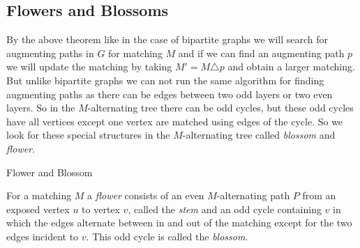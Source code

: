 \subsection{Flowers and Blossoms}
By the above theorem like in the case of bipartite graphs we will search for augmenting paths in $G$ for matching $M$ and if we can find an augmenting path $p$ we will update the matching by taking $M'=M\triangle p$ and obtain a larger matching. But unlike bipartite graphs we can not run the same algorithm for finding augmenting paths as there can be edges between two odd layers or two even layers. So in the $M$-alternating tree there can be odd cycles, but these odd cycles have all vertices except one vertex are matched using edges of the cycle. So we look for these special structures in the $M$-alternating tree called \emph{blossom} and \emph{flower}.
\begin{Definition}{Flower and Blossom}{}
	\begin{minipage}{0.65\textwidth}
		For a matching $M$ a \emph{flower} consists of an even $M$-alternating path $P$ from an exposed vertex $u$ to vertex $v$, called the \emph{stem} and an odd cycle containing $v$ in which the edges alternate between in and out of the matching except for the two edges incident to $v$. This odd cycle is called the \emph{blossom}.
	\end{minipage}\hspace{5pt}
	\begin{minipage}{0.25\textwidth}
		\usetikzlibrary{decorations.pathreplacing}
	\end{minipage}
\end{Definition}

